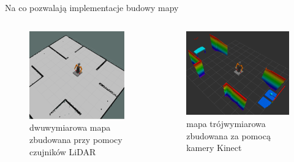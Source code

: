 \begin{frame}{Na co pozwalają implementacje budowy mapy}
	\begin{columns}
		\begin{column}{0.5\textwidth}
			\begin{figure}
				\centering
				\includegraphics[height=0.6\textheight]{img/mapa_2d.png}
				\caption{dwuwymiarowa mapa zbudowana przy pomocy czujników LiDAR}
			\end{figure}
		\end{column}
		\begin{column}{0.5\textwidth}  %
			\begin{figure}
				\centering
				\includegraphics[height=0.6\textheight]{img/octomapa.png}
				\caption{mapa trójwymiarowa zbudowana za pomocą kamery Kinect}
			\end{figure}
		\end{column}
	\end{columns}
\end{frame}


